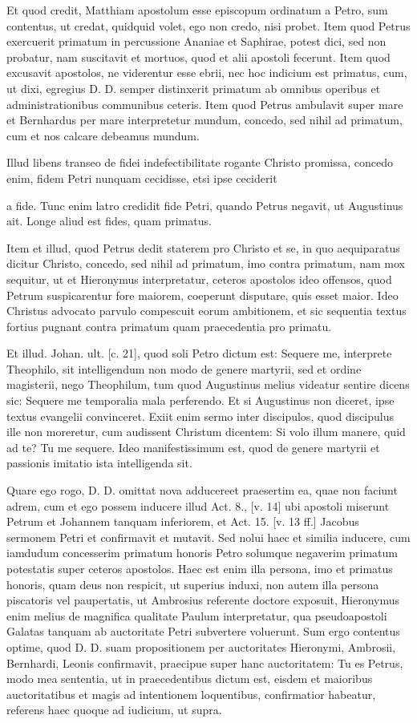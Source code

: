 Et quod credit, Matthiam apostolum esse episcopum ordinatum a Petro, sum contentus, ut credat, quidquid volet, ego non credo, nisi probet. Item quod Petrus exercuerit primatum in percussione Ananiae et Saphirae, potest dici, sed non probatur, nam suscitavit et mortuos, quod et alii apostoli fecerunt. Item quod excusavit apostolos, ne viderentur esse ebrii, nec hoc indicium est primatus, cum, ut dixi, egregius D. D. semper distinxerit primatum ab omnibus operibus et administrationibus communibus ceteris. Item quod Petrus ambulavit super mare et Bernhardus per mare interpretetur mundum, concedo, sed nihil ad primatum, cum et nos calcare debeamus mundum.

Illud libens transeo de fidei indefectibilitate rogante Christo promissa, concedo enim, fidem Petri nunquam cecidisse, etsi ipse ceciderit

a fide. Tunc enim latro credidit fide Petri, quando Petrus negavit, ut Augustinus ait. Longe aliud est fides, quam primatus.

Item et illud, quod Petrus dedit staterem pro Christo et se, in quo aequiparatus dicitur Christo, concedo, sed nihil ad primatum, imo contra primatum, nam mox sequitur, ut et Hieronymus interpretatur, ceteros apostolos ideo offensos, quod Petrum suspicarentur fore maiorem, coeperunt disputare, quis esset maior. Ideo Christus advocato parvulo compescuit eorum ambitionem, et sic sequentia textus fortius pugnant contra primatum quam praecedentia pro primatu.

Et illud. Johan. ult. [c. 21], quod soli Petro dictum est: Sequere me, interprete Theophilo, sit intelligendum non modo de genere martyrii, sed et ordine magisterii, nego Theophilum, tum quod Augustinus melius videatur sentire dicens sic: Sequere me temporalia mala perferendo. Et si Augustinus non diceret, ipse textus evangelii convinceret. Exiit enim sermo inter discipulos, quod discipulus ille non moreretur, cum audissent Christum dicentem: Si volo illum manere, quid ad te? Tu me sequere. Ideo manifestissimum est, quod de genere martyrii et passionis imitatio ista intelligenda sit.

\marginpar{\small[320]} Quare ego rogo, D. D. omittat nova adducereet praesertim ea, quae non faciunt adrem, cum et ego possem inducere illud Act. 8., [v. 14] ubi apostoli miserunt Petrum et Johannem tanquam inferiorem, et Act. 15. [v. 13 ff.] Jacobus sermonem Petri et confirmavit et mutavit. Sed nolui haec et similia inducere, cum iamdudum concesserim primatum honoris Petro solumque negaverim primatum potestatis super ceteros apostolos. Haec est enim illa persona, imo et primatus honoris, quam deus non respicit, ut superius induxi, non autem illa persona piscatoris vel paupertatis, ut Ambrosius referente doctore exposuit, Hieronymus enim melius de magnifica qualitate Paulum interpretatur, qua pseudoapostoli Galatas tanquam ab auctoritate Petri subvertere voluerunt. Sum ergo contentus optime, quod D. D. suam propositionem per auctoritates Hieronymi, Ambrosii, Bernhardi, Leonis confirmavit, praecipue super hanc auctoritatem: Tu es Petrus, modo mea sententia, ut in praecedentibus dictum est, eisdem et maioribus auctoritatibus et magis ad intentionem loquentibus, confirmatior habeatur, referens haec quoque ad iudicium, ut supra.

